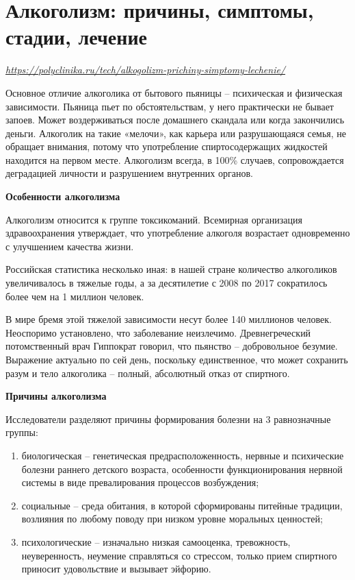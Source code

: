 \newpage
\section{Алкоголизм: причины, симптомы, стадии, лечение}

 {\it \url{https://polyclinika.ru/tech/alkogolizm-prichiny-simptomy-lechenie/}}

Основное отличие алкоголика от бытового пьяницы – психическая и физическая зависимости. Пьяница пьет по обстоятельствам, у него практически не бывает запоев. Может воздерживаться после домашнего скандала или когда закончились деньги. Алкоголик на такие «мелочи», как карьера или разрушающаяся семья, не обращает внимания, потому что употребление спиртосодержащих жидкостей находится на первом месте. Алкоголизм всегда, в 100\% случаев, сопровождается деградацией личности и разрушением внутренних органов.

\textbf{Особенности алкоголизма}

Алкоголизм относится к группе токсикоманий. Всемирная организация здравоохранения утверждает, что употребление алкоголя возрастает одновременно с улучшением качества жизни.

Российская статистика несколько иная: в нашей стране количество алкоголиков увеличивалось в тяжелые годы, а за десятилетие с 2008 по 2017 сократилось более чем на 1 миллион человек.

В мире бремя этой тяжелой зависимости несут более 140 миллионов человек. Неоспоримо установлено, что заболевание неизлечимо. Древнегреческий потомственный врач Гиппократ говорил, что пьянство – добровольное безумие. Выражение актуально по сей день, поскольку единственное, что может сохранить разум и тело алкоголика – полный, абсолютный отказ от спиртного.

\textbf{Причины алкоголизма}

Исследователи разделяют причины формирования болезни на 3 равнозначные группы:
\begin{enumerate}
    \item биологическая – генетическая предрасположенность, нервные и психические болезни раннего детского возраста, особенности функционирования нервной системы в виде превалирования процессов возбуждения;
    \item социальные – среда обитания, в которой сформированы питейные традиции, возлияния по любому поводу при низком уровне моральных ценностей;
    \item психологические – изначально низкая самооценка, тревожность, неуверенность, неумение справляться со стрессом, только прием спиртного приносит удовольствие и вызывает эйфорию.
\end{enumerate}

